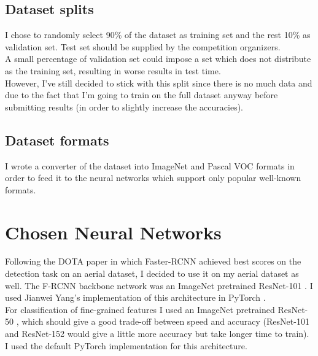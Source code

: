 \documentclass[]{article}
\begin{document}
\subsection{Dataset splits}
I chose to randomly select 90\% of the dataset as training set and the rest 10\% as validation set. Test set should be supplied by the competition organizers.\\
A small percentage of validation set could impose a set which does not distribute as the training set, resulting in worse results in test time.\\
However, I've still decided to stick with this split since there is no much data and due to the fact that I'm going to train on the full dataset anyway before submitting results (in order to slightly increase the accuracies).

\subsection{Dataset formats}
I wrote a converter of the dataset into ImageNet \cite{imagenet} and Pascal VOC \cite{pascalvoc} formats in order to feed it to the neural networks which support only popular well-known formats.

\section{Chosen Neural Networks}
Following the DOTA paper \cite{dota} in which Faster-RCNN \cite{fasterrcnn} achieved best scores on the detection task on an aerial dataset, I decided to use it on my aerial dataset as well. The F-RCNN \cite{fasterrcnn} backbone network was an ImageNet \cite{imagenet} pretrained ResNet-101 \cite{resnet}. I used Jianwei Yang's implementation \cite{jianweiyang} of this architecture in PyTorch \cite{pytorch}.\\
For classification of fine-grained features I used an ImageNet \cite{imagenet} pretrained ResNet-50 \cite{resnet}, which should give a good trade-off between speed and accuracy (ResNet-101 and ResNet-152 would give a little more accuracy but take longer time to train). I used the default PyTorch \cite{pytorch} implementation for this architecture.
\end{document}
